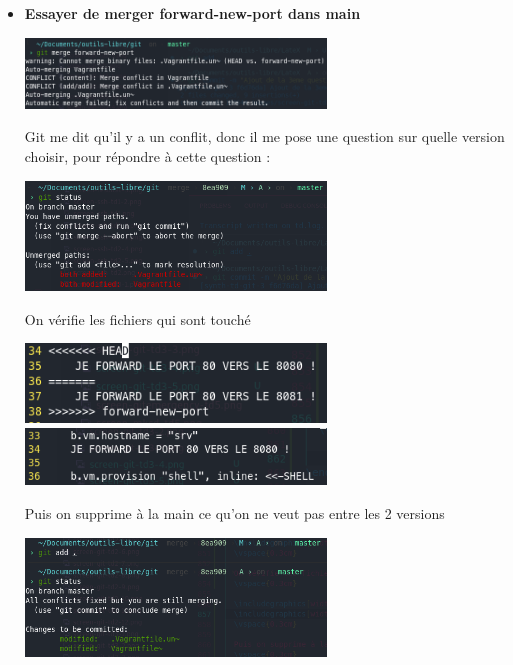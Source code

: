 \documentclass[12pt]{article}
\begin{document}
\begin{itemize}
  \item \textbf{Essayer de merger forward-new-port dans main}
  \vspace{0.3cm}

  \includegraphics[width=8cm]{images/screen-git-td3-4.png}
  \vspace{0.3cm}

  Git me dit qu'il y a un conflit, donc il me pose une question sur quelle version choisir, pour répondre à cette question :
  \vspace{0.3cm}

  \includegraphics[width=8cm]{images/screen-git-td3-5.png}
  \vspace{0.3cm}

  On vérifie les fichiers qui sont touché
  \vspace{0.3cm}

  \includegraphics[width=8cm]{images/screen-git-td3-6.png} \hfill
  \includegraphics[width=8cm]{images/screen-git-td3-7.png}
  \vspace{0.3cm}

  Puis on supprime à la main ce qu'on ne veut pas entre les 2 versions
  \vspace{0.3cm}

  \includegraphics[width=8cm]{images/screen-git-td3-8.png}
  \vspace{0.3cm}


\end{itemize}
\end{document}
